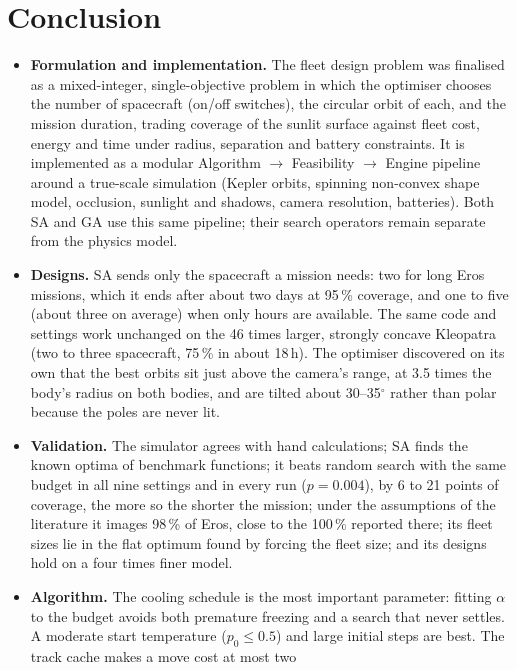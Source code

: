 \chapter{Conclusion}
\label{ch:conclusion}

\begin{itemize}
\item \textbf{Formulation and implementation.} The fleet design problem was finalised as a
mixed-integer, single-objective problem in which the optimiser chooses the number of spacecraft
(on/off switches), the circular orbit of each, and the mission duration, trading coverage of the
sunlit surface against fleet cost, energy and time under radius, separation and battery
constraints. It is implemented as a modular Algorithm $\rightarrow$ Feasibility $\rightarrow$ Engine
pipeline around a true-scale simulation (Kepler orbits, spinning non-convex shape model, occlusion,
sunlight and shadows, camera resolution, batteries). Both \ac{SA} and \ac{GA} use this same pipeline;
their search operators remain separate from the physics model.
\item \textbf{Designs.} \ac{SA} sends only the spacecraft a mission needs: two for long Eros missions,
which it ends after about two days at 95\,\% coverage, and one to five (about three on average) when
only hours are available. The same code and settings work unchanged on the 46 times larger, strongly concave
Kleopatra (two to three spacecraft, 75\,\% in about 18\,h). The optimiser discovered on its own that the
best orbits sit just above the camera's range, at 3.5 times the body's radius on both bodies, and are
tilted about 30--35$^\circ$ rather than polar because the poles are never lit.
\item \textbf{Validation.} The simulator agrees with hand calculations; \ac{SA} finds the known optima of
benchmark functions; it beats random search with the same budget in all nine settings and in every
run ($p=0.004$), by 6 to 21 points of coverage, the more so the shorter the mission; under the
assumptions of the literature it images 98\,\% of Eros, close to the 100\,\% reported there; its fleet
sizes lie in the flat optimum found by forcing the fleet size; and its designs hold on a four times
finer model.
\item \textbf{Algorithm.} The cooling schedule is the most important parameter: fitting $\alpha$ to the
budget avoids both premature freezing and a search that never settles. A moderate start temperature
($p_0\le0.5$) and large initial steps are best. The track cache makes a move cost at most two

\end{itemize}
